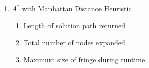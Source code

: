 \documentclass[letter]{article}
\begin{document}
\begin{enumerate}[resume]
\begin{enumerate}
			\item {$ A^* $ with Manhattan Distance Heuristic} 
			\begin{enumerate}
				\item {Length of solution path returned} 
				\item {Total number of nodes expanded} 
				\item {Maximum size of fringe during runtime}
			\end{enumerate}
		\end{enumerate}
	\end{enumerate}
\end{document}
